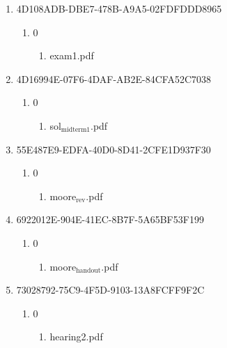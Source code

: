 \documentclass[11pt]{article}
\begin{document}
\begin{enumerate}
\begin{enumerate}
\begin{enumerate}
\begin{enumerate}
\begin{enumerate}
\begin{enumerate}
\begin{enumerate}
\begin{enumerate}
\begin{enumerate}
\begin{enumerate}
\begin{enumerate}
\item 4D108ADB-DBE7-478B-A9A5-02FDFDDD8965
\label{sec-1-1-1-1-7-3-24-12-1-1-1-1-1-4}
\begin{enumerate}
\item 0
\label{sec-1-1-1-1-7-3-24-12-1-1-1-1-1-4-1}
\begin{enumerate}
\item exam1.pdf
\label{sec-1-1-1-1-7-3-24-12-1-1-1-1-1-4-1-1}
\end{enumerate}
\end{enumerate}

\item 4D16994E-07F6-4DAF-AB2E-84CFA52C7038
\label{sec-1-1-1-1-7-3-24-12-1-1-1-1-1-5}
\begin{enumerate}
\item 0
\label{sec-1-1-1-1-7-3-24-12-1-1-1-1-1-5-1}
\begin{enumerate}
\item sol$_{\text{midterm1}}$.pdf
\label{sec-1-1-1-1-7-3-24-12-1-1-1-1-1-5-1-1}
\end{enumerate}
\end{enumerate}

\item 55E487E9-EDFA-40D0-8D41-2CFE1D937F30
\label{sec-1-1-1-1-7-3-24-12-1-1-1-1-1-6}
\begin{enumerate}
\item 0
\label{sec-1-1-1-1-7-3-24-12-1-1-1-1-1-6-1}
\begin{enumerate}
\item moore$_{\text{rev}}$.pdf
\label{sec-1-1-1-1-7-3-24-12-1-1-1-1-1-6-1-1}
\end{enumerate}
\end{enumerate}

\item 6922012E-904E-41EC-8B7F-5A65BF53F199
\label{sec-1-1-1-1-7-3-24-12-1-1-1-1-1-7}
\begin{enumerate}
\item 0
\label{sec-1-1-1-1-7-3-24-12-1-1-1-1-1-7-1}
\begin{enumerate}
\item moore$_{\text{handout}}$.pdf
\label{sec-1-1-1-1-7-3-24-12-1-1-1-1-1-7-1-1}
\end{enumerate}
\end{enumerate}

\item 73028792-75C9-4F5D-9103-13A8FCFF9F2C
\label{sec-1-1-1-1-7-3-24-12-1-1-1-1-1-8}
\begin{enumerate}
\item 0
\label{sec-1-1-1-1-7-3-24-12-1-1-1-1-1-8-1}
\begin{enumerate}
\item hearing2.pdf
\label{sec-1-1-1-1-7-3-24-12-1-1-1-1-1-8-1-1}
\end{enumerate}
\end{enumerate}


\end{enumerate}
\end{enumerate}
\end{enumerate}
\end{enumerate}
\end{enumerate}
\end{enumerate}
\end{enumerate}
\end{enumerate}
\end{enumerate}
\end{enumerate}
\end{enumerate}
\end{document}

